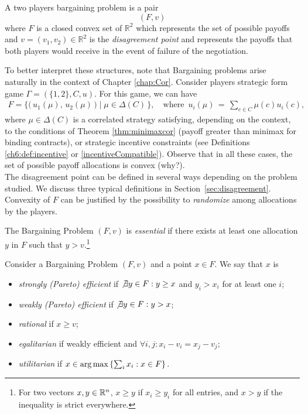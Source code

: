 \begin{definition}
A two players bargaining problem is a pair
$$(F, v)$$ where $F$ is a closed convex set of $\mathbb{R}^2$ which represents the set of possible payoffs and $v = (v_1, v_2) \in \mathbb{R}^2$ is the \emph{disagreement point} and represents the payoffs that both players would receive in the event of failure of the negotiation.
\end{definition}
To better interpret these structures, note that Bargaining problems arise naturally in the context of Chapter \ref{chap:Cor}.
Consider players strategic form game $\Gamma = (\{1,2\}, C, u)$.
For this game, we can have
\begin{align*}
	F = \Big\{ \big( \, u_1(\mu), \, u_2(\mu) \, \big) \; | \; \mu \in \Delta(C) \, \Big\}, \quad \text{where } \, u_i(\mu) \, = \, \sum_{c \in C} \mu(c) u_i(c),
\end{align*}
where $\mu \in \Delta(C)$ is a correlated strategy satisfying, depending on the context, to the conditions of Theorem \ref{thm:minimaxcor} (payoff greater than minimax for binding contracts), or strategic incentive constraints (see Definitions \ref{ch6:def:incentive} or \ref{incentiveCompatible}). Observe that in all these cases, the set of possible payoff allocations is convex (why?).\\
The disagreement point can be defined in several ways depending on the problem studied. We discuss three typical definitions in Section~\ref{sec:disagreement}.\\
Convexity of $F$ can be justified by the possibility to \emph{randomize} among allocations by the players.

\begin{definition}[Essential]
The Bargaining Problem $(F, v)$ is \emph{essential} if there exists at least one allocation $y$ in $F$ such that $y > v$.\footnote{For two vectors $x,y \in \mathbb{R}^n$, $x \geq y$ if $x_i \geq y_i$ for all entries, and $x > y$ if the inequality is strict everywhere.}
\end{definition}
 \vspace{2cm}

\begin{definition}
Consider a Bargaining Problem $(F, v)$ and a point $x \in F$. We say that $x$ is
\begin{itemize}
\item \emph{strongly (Pareto) efficient} if $\not \exists y \in F: y \geq x$ and $y_i > x_i$ for at least one $i$;
\item \emph{weakly (Pareto) efficient} if $\not \exists y \in F: y > x$;
\item \emph{rational} if $x \geq v$;
\item \emph{egalitarian} if weakly efficient and $\forall i,j: x_i-v_i = x_j-v_j$;
\item \emph{utilitarian} if
$x \in \operatorname*{arg\,max} \left \{ \sum_i x_i : x \in F \right \}.$
\end{itemize}
\label{defEffiEgalUti}
\end{definition}

